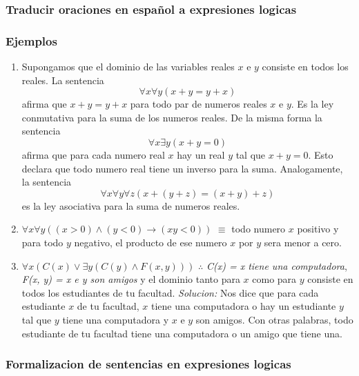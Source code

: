 \documentclass[]{article}
\begin{document}
\subsubsection*{Traducir oraciones en español a expresiones logicas}

\subsubsection*{Ejemplos}

\begin{enumerate}
	\item Supongamos que el dominio de las variables reales $x$ e $y$ consiste en todos los reales. La sentencia 
	\begin{equation*}
		\forall{x} \forall{y} (x + y = y + x)
	\end{equation*} 
	afirma que $x + y = y + x$ para todo par de numeros reales $x$ e $y$. Es la ley conmutativa para la suma de los numeros reales. De la misma forma la sentencia 
	\begin{equation*}
		\forall{x} \exists{y} (x + y = 0)
	\end{equation*} 
	afirma que para cada numero real $x$ hay un real $y$ tal que $x + y = 0$. Esto declara que todo numero real tiene un inverso para la suma. Analogamente, la sentencia 
	\begin{equation*}
		\forall{x}\forall{y}\forall{z} (x + (y + z) = (x + y) + z)
	\end{equation*} 
	es la ley asociativa para la suma de numeros reales.
	
	\item $\forall{x} \forall{y} ((x > 0) \wedge (y < 0) \rightarrow (xy < 0))$ $\equiv$ todo numero $x$ positivo y para todo $y$ negativo, el producto de ese numero $x$ por $y$ sera menor a cero.
	
	\item $\forall{x} (C(x) \vee \exists{y} (C(y) \wedge F(x, y)))$ $\therefore$ \textit{C(x) = x tiene una computadora}, \textit{F(x, y) = x e y son amigos} y el dominio tanto para $x$ como para $y$ consiste en todos los estudiantes de tu facultad.
	\textit{Solucion:}
	Nos dice que para cada estudiante $x$ de tu facultad, $x$ tiene una computadora o hay un estudiante $y$ tal que $y$ tiene una computadora y $x$ e $y$ son amigos. Con otras palabras, todo estudiante de tu facultad tiene una computadora o un amigo que tiene una.
\end{enumerate}

\subsubsection*{Formalizacion de sentencias en expresiones logicas}
\end{document}

